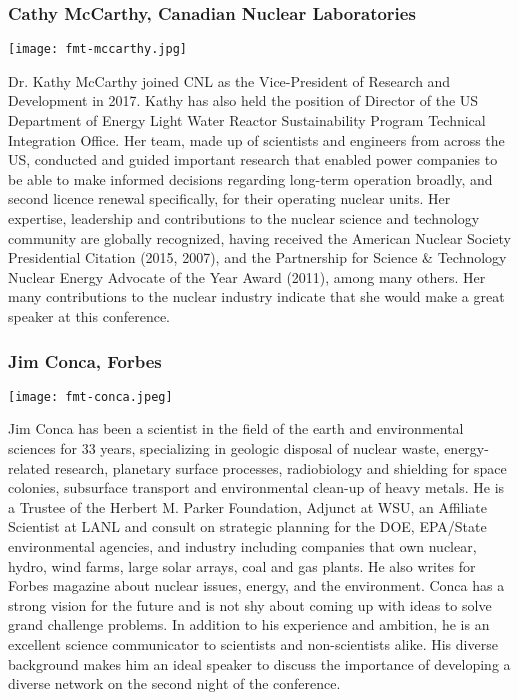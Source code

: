 \subsubsection{Cathy McCarthy, Canadian Nuclear Laboratories}
\begin{minipage}{0.25\textwidth}
	\centering
	\texttt{[image: fmt-mccarthy.jpg]}
\end{minipage}
\begin{minipage}{0.73\textwidth}
	Dr. Kathy McCarthy joined CNL as the Vice-President of Research and Development in 2017. Kathy has also held the position of Director of the US Department of Energy Light Water Reactor Sustainability Program Technical Integration Office. Her team, made up of scientists and engineers from across the US, conducted and guided important research that enabled power companies to be able to make informed decisions regarding long-term operation broadly, and second licence renewal specifically, for their operating nuclear units. Her expertise, leadership and contributions to the nuclear science and technology community are globally recognized, having received the American Nuclear Society Presidential Citation (2015, 2007), and the Partnership for Science \& Technology Nuclear Energy Advocate of the Year Award (2011), among many others. Her many contributions to the nuclear industry indicate that she would make a great speaker at this conference. 
\end{minipage}


\subsubsection{Jim Conca, Forbes}
\begin{minipage}{0.25\textwidth}
	\centering
	\texttt{[image: fmt-conca.jpeg]}
\end{minipage}
\begin{minipage}{0.73\textwidth}
	Jim Conca has been a scientist in the field of the earth and environmental sciences for 33 years, specializing in geologic disposal of nuclear waste, energy-related research, planetary surface processes, radiobiology and shielding for space colonies, subsurface transport and environmental clean-up of heavy metals. He is a Trustee of the Herbert M. Parker Foundation, Adjunct at WSU, an Affiliate Scientist at LANL and consult on strategic planning for the DOE, EPA/State environmental agencies, and industry including companies that own nuclear, hydro, wind farms, large solar arrays, coal and gas plants. He also writes for Forbes magazine about nuclear issues, energy, and the environment. Conca has a strong vision for the future and is not shy about coming up with ideas to solve grand challenge problems. In addition to his experience and ambition, he is an excellent science communicator to scientists and non-scientists alike. His diverse background makes him an ideal speaker to discuss the importance of developing a diverse network on the second night of the conference.
\end{minipage}



